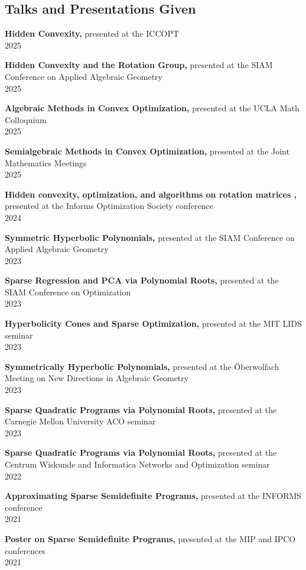 \documentclass[margin]{res}
\begin{document}
\begin{resume}
\section{Talks and Presentations Given}
{\bf  Hidden Convexity,} presented at the ICCOPT \\ 2025

{\bf  Hidden Convexity and the Rotation Group,} presented at the SIAM Conference on Applied Algebraic Geometry \\ 2025

{\bf  Algebraic Methods in Convex Optimization,} presented at the UCLA Math Colloquium \\ 2025

{\bf  Semialgebraic Methods in Convex Optimization,} presented at the Joint Mathematics Meetings \\ 2025 

{\bf  Hidden convexity, optimization, and algorithms on rotation matrices  ,} presented at the Informs Optimization Society conference \\ 2024 

{\bf  Symmetric Hyperbolic Polynomials,} presented at the SIAM Conference on Applied Algebraic Geometry \\ 2023 

{\bf  Sparse Regression and PCA via Polynomial Roots,} presented at the SIAM Conference on Optimization \\ 2023 

{\bf  Hyperbolicity Cones and Sparse Optimization,} presented at the MIT LIDS seminar \\ 2023 

{\bf  Symmetrically Hyperbolic Polynomials,} presented at the \"Oberwolfach Meeting on New Directions in Algebraic Geometry \\ 2023 

{\bf  Sparse Quadratic Programs via Polynomial Roots,} presented at the Carnegie Mellon University ACO seminar \\ 2023 

{\bf  Sparse Quadratic Programs via Polynomial Roots,} presented at the Centrum Wiskunde and Informatica Networks and Optimization seminar \\ 2022 

{\bf  Approximating Sparse Semidefinite Programs,} presented at the INFORMS conference \\ 2021 

{\bf  Poster on Sparse Semidefinite Programs,} presented at the MIP and IPCO conferences \\ 2021 


\end{resume}
\end{document}
